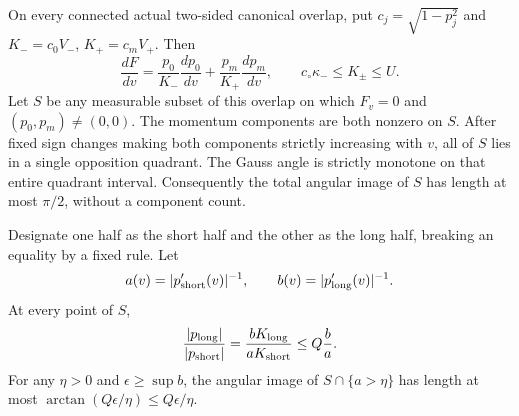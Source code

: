\begin{lemma}
\label{lem:iso-balance}
On every connected actual two-sided canonical overlap, put
$c_j=\sqrt{1-p_j^2}$ and $K_-=c_0V_-$, $K_+=c_mV_+$.
Then
\begin{equation}\label{eq:iso-first-variation}
 \frac{dF}{dv}=
       \frac{p_0}{K_-}\frac{dp_0}{dv}
       +\frac{p_m}{K_+}\frac{dp_m}{dv},
 \qquad c_\circ\kappa_-\le K_\pm\le U.
\end{equation}
Let $S$ be any measurable subset of this overlap on which
$F_v=0$ and $(p_0,p_m)\ne(0,0)$.
The momentum components are both nonzero on $S$. After fixed
sign changes making both components strictly increasing with $v$,
all of $S$ lies in a single opposition quadrant.
The Gauss angle is strictly monotone on that entire quadrant
interval. Consequently the total angular image of $S$ has length
at most $\pi/2$, without a component count.

Designate one half as the short half and the other as the long half,
breaking an equality by a fixed rule. Let
\[
 a(v)=|p_{\rm short}'(v)|^{-1},\qquad
 b(v)=|p_{\rm long}'(v)|^{-1}.
\]
At every point of $S$,
\begin{equation}\label{eq:iso-balance-ratio}
 \frac{|p_{\rm long}|}{|p_{\rm short}|}
       =\frac{bK_{\rm long}}{aK_{\rm short}}
       \le Q\frac ba.
\end{equation}
For any $\eta>0$ and $\epsilon\ge\sup b$, the angular image of
$S\cap\{a>\eta\}$ has length at most
$\arctan(Q\epsilon/\eta)\le Q\epsilon/\eta$.
\end{lemma}
